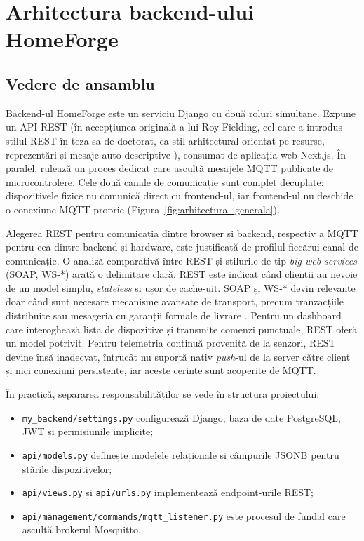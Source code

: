 \chapter{Arhitectura backend-ului HomeForge}

\section{Vedere de ansamblu}
Backend-ul HomeForge este un serviciu Django cu două roluri simultane. Expune un API REST (în accepțiunea originală a lui Roy Fielding, cel care a introdus stilul REST în teza sa de doctorat, ca stil arhitectural orientat pe resurse, reprezentări și mesaje auto-descriptive \cite{fielding_rest_dissertation}), consumat de aplicația web Next.js. În paralel, rulează un proces dedicat care ascultă mesajele MQTT publicate de microcontrolere. Cele două canale de comunicație sunt complet decuplate: dispozitivele fizice nu comunică direct cu frontend-ul, iar frontend-ul nu deschide o conexiune MQTT proprie (Figura~\ref{fig:arhitectura_generala}).

Alegerea REST pentru comunicația dintre browser și backend, respectiv a MQTT pentru cea dintre backend și hardware, este justificată de profilul fiecărui canal de comunicație. O analiză comparativă între REST și stilurile de tip \emph{big web services} (SOAP, WS-*) arată o delimitare clară. REST este indicat când clienții au nevoie de un model simplu, \textit{stateless} și ușor de cache-uit. SOAP și WS-* devin relevante doar când sunt necesare mecanisme avansate de transport, precum tranzacțiile distribuite sau mesageria cu garanții formale de livrare \cite{pautasso_rest_vs_ws}. Pentru un dashboard care interoghează lista de dispozitive și transmite comenzi punctuale, REST oferă un model potrivit. Pentru telemetria continuă provenită de la senzori, REST devine însă inadecvat, întrucât nu suportă nativ \textit{push}-ul de la server către client și nici conexiuni persistente, iar aceste cerințe sunt acoperite de MQTT.

În practică, separarea responsabilităților se vede în structura proiectului:
\begin{itemize}
    \item \texttt{my\_backend/settings.py} configurează Django, baza de date PostgreSQL, JWT și permisiunile implicite;
    \item \texttt{api/models.py} definește modelele relaționale și câmpurile JSONB pentru stările dispozitivelor;
    \item \texttt{api/views.py} și \texttt{api/urls.py} implementează endpoint-urile REST;
    \item \texttt{api/management/commands/mqtt\_listener.py} este procesul de fundal care ascultă brokerul Mosquitto.
\end{itemize}

